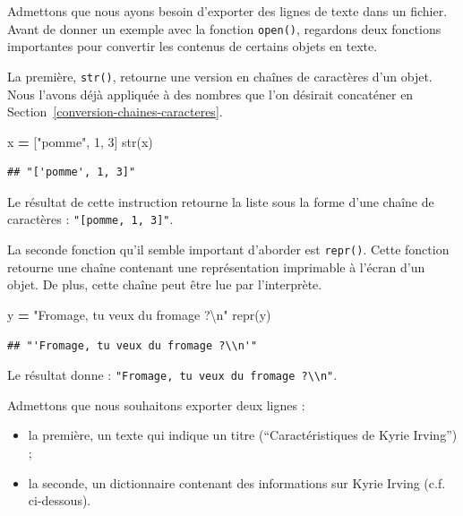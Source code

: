 \documentclass[
  12pt,
]{book}
\newenvironment{Shaded}{\begin{snugshade}}{\end{snugshade}}
\newcommand{\BuiltInTok}[1]{#1}
\newcommand{\CharTok}[1]{\textcolor[rgb]{0.31,0.60,0.02}{#1}}
\newcommand{\DecValTok}[1]{\textcolor[rgb]{0.00,0.00,0.81}{#1}}
\newcommand{\NormalTok}[1]{#1}
\newcommand{\OperatorTok}[1]{\textcolor[rgb]{0.81,0.36,0.00}{\textbf{#1}}}
\newcommand{\StringTok}[1]{\textcolor[rgb]{0.31,0.60,0.02}{#1}}
\providecommand{\tightlist}{%
  \setlength{\itemsep}{0pt}\setlength{\parskip}{0pt}}
\numberwithin{equation}{section}
\numberwithin{countremarque}{section}
\begin{document}
Admettons que nous ayons besoin d'exporter des lignes de texte dans un fichier. Avant de donner un exemple avec la fonction \texttt{open()}, regardons deux fonctions importantes pour convertir les contenus de certains objets en texte.

La première, \texttt{str()}, retourne une version en chaînes de caractères d'un objet. Nous l'avons déjà appliquée à des nombres que l'on désirait concaténer en Section~\ref{conversion-chaines-caracteres}.

\begin{Shaded}
\begin{Highlighting}[]
\NormalTok{x }\OperatorTok{=}\NormalTok{ [}\StringTok{"pomme"}\NormalTok{, }\DecValTok{1}\NormalTok{, }\DecValTok{3}\NormalTok{]}
\BuiltInTok{str}\NormalTok{(x)}
\end{Highlighting}
\end{Shaded}

\begin{lstlisting}
## "['pomme', 1, 3]"
\end{lstlisting}

Le résultat de cette instruction retourne la liste sous la forme d'une chaîne de caractères : \texttt{"{[}\textquotesingle{}pomme\textquotesingle{},\ 1,\ 3{]}"}.

La seconde fonction qu'il semble important d'aborder est \texttt{repr()}. Cette fonction retourne une chaîne contenant une représentation imprimable à l'écran d'un objet. De plus, cette chaîne peut être lue par l'interprète.

\begin{Shaded}
\begin{Highlighting}[]
\NormalTok{y }\OperatorTok{=} \StringTok{"Fromage, tu veux du fromage ?}\CharTok{\textbackslash{}n}\StringTok{"}
\BuiltInTok{repr}\NormalTok{(y)}
\end{Highlighting}
\end{Shaded}

\begin{lstlisting}
## "'Fromage, tu veux du fromage ?\\n'"
\end{lstlisting}

Le résultat donne : \texttt{"\textquotesingle{}Fromage,\ tu\ veux\ du\ fromage\ ?\textbackslash{}\textbackslash{}n\textquotesingle{}"}.

Admettons que nous souhaitons exporter deux lignes :

\begin{itemize}
\tightlist
\item
  la première, un texte qui indique un titre (``Caractéristiques de Kyrie Irving'') ;
\item
  la seconde, un dictionnaire contenant des informations sur Kyrie Irving (c.f. ci-dessous).
\end{itemize}
\end{document}
